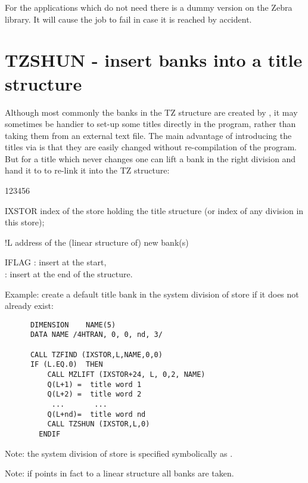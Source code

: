 For the applications which do not need  there is a dummy
version on the Zebra library. It will cause the job to fail
in case it is reached by accident.

\section{TZSHUN - insert banks into a title structure}

Although most commonly the banks in the TZ structure
are created by ,
it may sometimes be handier
to set-up some titles directly in the program,
rather than taking them from an external text file.
The main advantage of introducing the titles via  is
that they are easily changed without re-compilation of the program.
But for a title which never changes one can lift a bank
in the right division and hand it to  to re-link
it into the TZ structure:


\begin{DLtt}{123456}
\item[IXSTOR] index of the store holding the title structure
              (or index of any division in this store);
\item[!L]     address of the (linear structure of) new bank(s)
\item[IFLAG]  :  insert at the start,\\
              :  insert at the end of the structure.
\end{DLtt}

Example: create a default title bank  in the system division
of store  if it does not already exist:

\begin{verbatim}
      DIMENSION    NAME(5)
      DATA NAME /4HTRAN, 0, 0, nd, 3/

      CALL TZFIND (IXSTOR,L,NAME,0,0)
      IF (L.EQ.0)  THEN
          CALL MZLIFT (IXSTOR+24, L, 0,2, NAME)
          Q(L+1) =  title word 1
          Q(L+2) =  title word 2
           ...       ...
          Q(L+nd)=  title word nd
          CALL TZSHUN (IXSTOR,L,0)
        ENDIF
\end{verbatim} 

Note: the system division of store  is specified
symbolically as .

Note: if  points in fact to a linear structure  all banks are taken.

